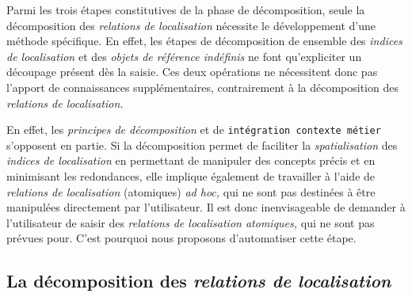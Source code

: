 Parmi les trois étapes constitutives de la phase de décomposition,
seule la décomposition des \emph{relations de localisation} nécessite
le développement d'une méthode spécifique. En effet, les étapes de
décomposition de ensemble des \emph{indices de localisation} et des
\emph{objets de référence indéfinis} ne font qu'expliciter un
découpage présent dès la saisie. Ces deux opérations ne nécessitent
donc pas l'apport de connaissances supplémentaires, contrairement à la
décomposition des \emph{relations de localisation.}

En effet, les \emph{principes de décomposition} et de
\texttt{intégration contexte métier} s'opposent en partie. Si la
décomposition permet de faciliter la \emph{spatialisation} des
\emph{indices de localisation} en permettant de manipuler des concepts
précis et en minimisant les redondances, elle implique également de
travailler à l'aide de \emph{relations de localisation} (atomiques)
\emph{ad hoc,} qui ne sont pas destinées à être manipulées directement
par l'utilisateur. Il est donc inenvisageable de demander à
l'utilisateur de saisir des \emph{relations de localisation
  atomiques,} qui ne sont pas prévues pour. C'est pourquoi nous
proposons d'automatiser cette étape.

\subsection{La décomposition des \emph{relations de localisation}}

